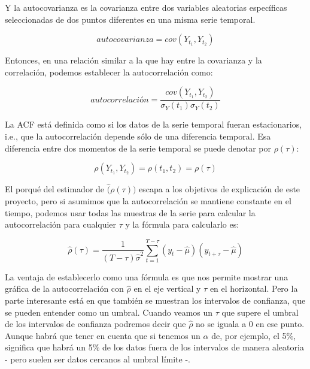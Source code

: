 Y la autocovarianza es la covarianza entre dos variables aleatorias específicas seleccionadas de dos puntos diferentes en una misma serie temporal. 

\begin{equation}
	autocovarianza = cov(Y_{t_{1}}, Y_{t_{2}})
\end{equation}

Entonces, en una relación similar a la que hay entre la covarianza y la correlación, podemos establecer la autocorrelación como:

\begin{equation}
	autocorrelación = \frac{cov(Y_{t_{1}}, Y_{t_{2}})}{\sigma_{Y}(t_{1})\sigma_{Y}(t_{2})}
\end{equation}

La ACF está definida como si los datos de la serie temporal fueran estacionarios, i.e., que la autocorrelación depende sólo de una diferencia temporal. Esa diferencia entre dos momentos de la serie temporal se puede denotar por $\rho(\tau)$:

\begin{equation}
	\rho(Y_{t_{1}}, Y_{t_{2}}) = \rho(t_{1}, t_{2}) = \rho(\tau)
\end{equation}

El porqué del estimador de $\hat(\rho(\tau))$ escapa a los objetivos de explicación de este proyecto, pero si asumimos que la autocorrelación se mantiene constante en el tiempo, podemos usar todas las muestras de la serie para calcular la autocorrelación para cualquier $\tau$ y la fórmula para calcularlo es:

\begin{equation}
	\hat{\rho}(\tau) = \frac{1}{(T-\tau)\hat{\sigma}^{2}} \sum_{t=1}^{T-\tau} (y_{t}-\hat{\mu})(y_{t+\tau}-\hat{\mu})
\end{equation}

La ventaja de establecerlo como una fórmula es que nos permite mostrar una gráfica de la autocorrelación con $\hat{\rho}$ en el eje vertical y $\tau$ en el horizontal. Pero la parte interesante está en que también se muestran los intervalos de confianza, que se pueden entender como un umbral. Cuando veamos un $\tau$ que supere el umbral de los intervalos de confianza podremos decir que $\hat{\rho}$ no se iguala a 0 en ese punto. Aunque habrá que tener en cuenta que si tenemos un $\alpha$ de, por ejemplo, el 5\%, significa que habrá un 5\% de los datos fuera de los intervalos de manera aleatoria - pero suelen ser datos cercanos al umbral límite -. 

